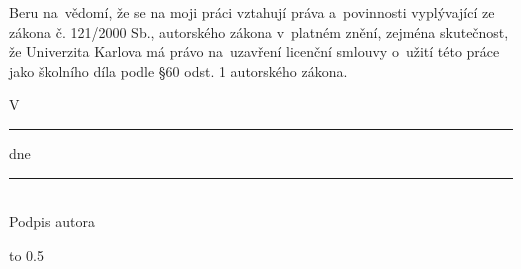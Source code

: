 \medskip\noindent
Beru na~vědomí, že se na moji práci vztahují práva a~povinnosti vyplývající
ze zákona č. 121/2000 Sb., autorského zákona v~platném znění, zejména skutečnost,
že Univerzita Karlova má právo na~uzavření licenční smlouvy o~užití této
práce jako školního díla podle §60 odst. 1 autorského zákona.

\vspace{10mm}


\noindent
\parbox{\textwidth}{
	\parbox[t]{.7\textwidth}{
		V \rule{4cm}{0.5pt} dne \rule{4cm}{0.5pt}
	}
	\hfill
	\parbox[t]{.27\textwidth}{
		\centering
		\hrulefill \\ Podpis autora
	}
}

\vspace{20mm}

\ifdefined\printVersion
	\cleardoublepage
\else
\fi

\newpage

\ifdefined\printVersion
\else
{}
\afterpage{\aftergroup\restoregeometry}
\fi

\begin{center}
	\noindent
	\Podekovani
\end{center}

\ifdefined\printVersion
	\cleardoublepage
\else
\fi

\newpage


\ifdefined\printVersion
\else
	\afterpage{\aftergroup\restoregeometry}
\fi


\vbox to 0.5

\newpage

